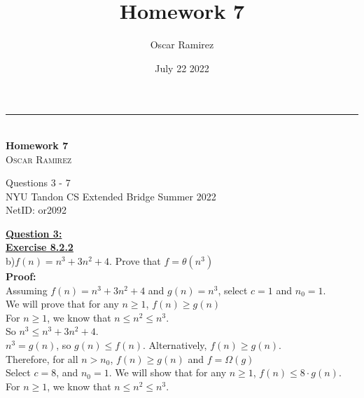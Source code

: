 \documentclass[12pt, letterpaper, twoside]{article}
\title{\textbf{Homework 7}}
\author{Oscar Ramirez}
\date{July 22 2022}
\begin{document}
\begin{titlepage}   

    \raggedleft %

    \rule{1pt}{\textheight} %
    \hspace{0.05\textwidth} %
    \parbox[b]{0.75\textwidth}{ %
        {\large\textit{}}\\[4\baselineskip]

        {\Huge\bfseries Homework 7}\\[2\baselineskip] %

        {\Large\textsc{Oscar Ramirez}} %

        \vspace{0.47\textheight} %
        {\noindent Questions 3 - 7}\\[0.1\baselineskip]
        {\noindent NYU Tandon CS Extended Bridge Summer 2022}\\[0.1\baselineskip]
        {\noindent NetID: or2092}\\[\baselineskip]
    }

\end{titlepage}
\newpage\noindent \textbf{\underline{Question 3:}}\\
\break
\textbf{\underline{Exercise 8.2.2}}\\
\break
b)$f(n) = n^3 + 3n^2 + 4$. Prove that $f = \theta(n^3)$\\
\break
\textbf{Proof:}\\
Assuming $f(n) = n^3 + 3n^2 + 4$ and $g(n) = n^3$, select $c = 1$ and $n_{0} = 1$. \\
We will prove that for any $n \geq 1$, $f(n) \geq g(n)$\\
For $n \geq 1$, we know that $n \leq n^2 \leq n^3$. \\
So $n^3 \leq n^3 + 3n^2 + 4$.\\
$n^3 = g(n)$, so $g(n) \leq f(n)$. Alternatively, $f(n) \geq g(n)$. \\
Therefore, for all $n > n_{0}$, $f(n) \geq g(n)$ and $f = \Omega(g)$\\
\break
Select $c = 8$, and $n_{0} = 1$. We will show that for any $n \geq 1$, $f(n) \leq 8\cdot g(n)$.\\
For $n \geq 1$, we know that $n \leq n^2 \leq n^3$. \\
\end{document}
